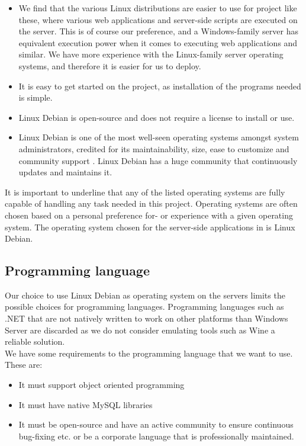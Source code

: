 \begin{itemize}
	\item We find that the various Linux distributions are easier to use for project like these, where various web applications and server-side scripts are executed on the server. This is of course our preference, and a Windows-family server has equivalent execution power when it comes to executing web applications and similar. We have more experience with the Linux-family server operating systems, and therefore it is easier for us to deploy.
	\item It is easy to get started on the project, as installation of the programs needed is simple.
	\item Linux Debian is open-source and does not require a license to install or use. 
	\item Linux Debian is one of the most well-seen operating systems amongst system administrators, credited for its maintainability, size, ease to customize and community support \citep{why_debian}. Linux Debian has a huge community that continuously updates and maintains it. 
\end{itemize}

It is important to underline that any of the listed operating systems are fully capable of handling any task needed in this project.
Operating systems are often chosen based on a personal preference for- or experience with a given operating system.
The operating system chosen for the server-side applications in \projectname{} is Linux Debian.

\subsection{Programming language}
Our choice to use Linux Debian as operating system on the servers limits the possible choices for programming languages. 
Programming languages such as .NET that are not natively written to work on other platforms than Windows Server are discarded as we do not consider emulating tools such as Wine a reliable solution. \\

We have some requirements to the programming language that we want to use.
These are:

\begin{itemize}
	\item It must support object oriented programming
	\item It must have native MySQL libraries
	\item It must be open-source and have an active community to ensure continuous bug-fixing etc. or be a corporate language that is professionally maintained.
\end{itemize} 

